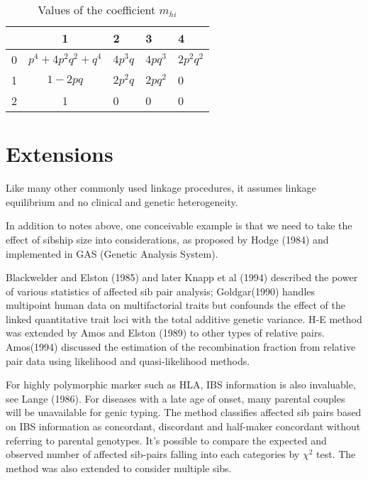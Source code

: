 \begin{table}[h]\centering
\caption{Values of the coefficient $m_{hi}$}
\begin{tabular}{cclll}
\hline
& 1&2&3&4\\
\hline
0 &$p^4+4p^2q^2+q^4$ & $4p^3q$ & $4pq^3$ & $2p^2q^2$\\
1 &$1-2pq$ & $2p^2q$ & $2pq^2$ & 0 \\
2 &1 & 0 & 0 & 0 \\
\hline
\end{tabular}
\end{table}


\section{Extensions} Like many other commonly used linkage procedures,
it assumes linkage equilibrium and no clinical and genetic
heterogeneity.

  In addition to notes above, one conceivable example is that we need to take
the effect of sibship size into considerations, as proposed by Hodge (1984) and
implemented in GAS (Genetic Analysis System).

Blackwelder and Elston (1985) and later Knapp et al (1994) described the power 
of various statistics of
affected sib pair analysis; Goldgar(1990) handles multipoint human data on
multifactorial traits but confounds the effect of the linked quantitative trait
loci with the total additive genetic variance.  H-E method was extended by Amos
and Elston (1989) to other types of relative pairs.  Amos(1994) discussed the
estimation of the recombination fraction from relative pair data using
likelihood and quasi-likelihood methods.

For highly polymorphic marker such as HLA, IBS information is also invaluable, see
Lange (1986).  For diseases with a late age of onset, many parental couples
will be unavailable for genic typing.  The method classifies affected sib pairs
based on IBS information as concordant, discordant and half-maker concordant
without referring to parental genotypes.  It's possible to compare the expected
and observed number of affected sib-pairs falling into each categories by
$\chi^2$ test. The method was also extended to consider multiple sibs.


